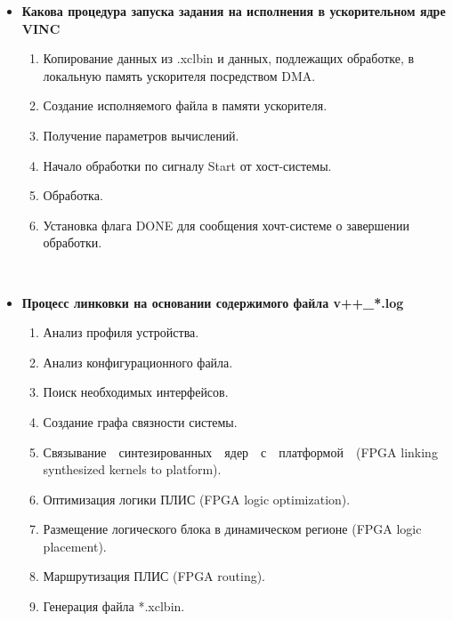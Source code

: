 \begin{itemize}[left=-0.5\parindent]
    \item \textbf{Какова процедура запуска задания на исполнения в
        ускорительном ядре VINC}
        \begin{enumerate}[leftmargin=\parindent]
            \item Копирование данных из .xclbin и данных, подлежащих обработке,
                  в локальную память ускорителя посредством DMA.
            \item Создание исполняемого файла в памяти ускорителя.
            \item Получение параметров вычислений.
            \item Начало обработки по сигналу Start от хост-системы.
            \item Обработка.
            \item Установка флага DONE для сообщения хочт-системе о завершении
                  обработки.
        \end{enumerate}
        ~\\

    \item \textbf{Процесс линковки на основании содержимого файла v++\_*.log}
        \begin{enumerate}[leftmargin=\parindent]
            \item Анализ профиля устройства.
            \item Анализ конфигурационного файла.
            \item Поиск необходимых интерфейсов.
            \item Создание графа связности системы.
            \item Связывание~~синтезированных~~ядер~~с~~платформой~~(FPGA linking
                  synthesized kernels to platform).
            \item Оптимизация логики ПЛИС (FPGA logic optimization).
            \item Размещение логического блока в динамическом регионе (FPGA
                  logic placement).
            \item Маршрутизация ПЛИС (FPGA routing).
            \item Генерация файла *.xclbin.
        \end{enumerate}
\end{itemize}
